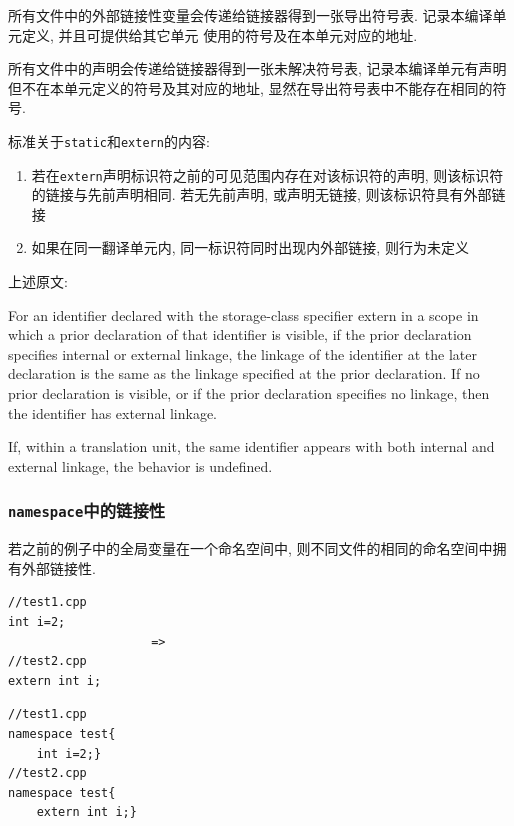 \vspace{1em}
所有文件中的外部链接性变量会传递给链接器得到一张导出符号表. 记录本编译单元定义, 并且可提供给其它单元
	使用的符号及在本单元对应的地址. 

所有文件中的声明会传递给链接器得到一张未解决符号表, 记录本编译单元有声明但不在本单元定义的符号及其对应的地址, 
	显然在导出符号表中不能存在相同的符号.

标准关于{\tt static}和{\tt extern}的内容:
\begin{enumerate}
	\item 若在{\tt extern}声明标识符之前的可见范围内存在对该标识符的声明, 则该标识符的链接与先前声明相同. 
			若无先前声明, 或声明无链接, 则该标识符具有外部链接
	\item 如果在同一翻译单元内, 同一标识符同时出现内外部链接, 则行为未定义
\end{enumerate}
上述原文:

For an identifier declared with the storage-class specifier extern in a scope 
in which a prior declaration of that identifier is visible, if the prior 
declaration specifies internal or external linkage, the linkage of the 
identifier at the later declaration is the same as the linkage specified 
at the prior declaration. If no prior declaration is visible, or if the 
prior declaration specifies no linkage, then the identifier has external 
linkage.

If, within a translation unit, the same identifier appears with both internal 
and external linkage, the behavior is undefined.

\subsubsection{{\tt namespace}中的链接性}
若之前的例子中的全局变量在一个命名空间中, 则不同文件的相同的命名空间中拥有外部链接性.
\begin{paracol}{2}
	\begin{leftcolumn}
		\begin{lstlisting}[xleftmargin=6em]
//test1.cpp
int i=2;
					=>
//test2.cpp
extern int i;
		\end{lstlisting}
	\end{leftcolumn}
	\begin{rightcolumn}
		\begin{lstlisting}
//test1.cpp
namespace test{
	int i=2;}
//test2.cpp
namespace test{
	extern int i;}
		\end{lstlisting}
	\end{rightcolumn}
\end{paracol}


